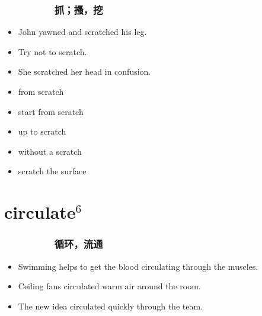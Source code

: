 \documentclass[UTF8,4pt,a3paper,space]{article}
\begin{document}
\begin{multicols}{4}
\subsubsection*{\ \ \ \ \ \ \ \ \ 抓；搔，挖}\begin{itemize}
\itemsep-0.5em
    \item John yawned and scratched his leg.    \item Try not to scratch.    \item She scratched her head in confusion. 
\end{itemize}
\begin{itemize}
\itemsep-0.5em
   \item from scratch   \item start from scratch   \item up to scratch   \item without a scratch   \item scratch the surface\end{itemize}
\hrulefill


\section{circulate$^6$}
\subsubsection*{\ \ \ \ \ \ \ \ \ 循环，流通}\begin{itemize}
\itemsep-0.5em
    \item Swimming helps to get the blood circulating through the muscles.    \item Ceiling fans circulated warm air around the room.    \item The new idea circulated quickly through the team. 
\end{itemize}
\hrulefill


\end{multicols}
\end{document}
